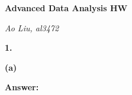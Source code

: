 \documentclass[letterpaper,11pt]{article}
\begin{document}
\begin{center}
	\textbf{\Huge{Advanced Data Analysis HW}}
\end{center}

\begin{center}
	\textsl{Ao Liu, al3472}
\end{center}

\bigbreak
\bigbreak
\bigbreak



\begin{addmargin}[-2em]{0em}
  \large{\textbf{1. }}
\end{addmargin}
\textbf{}\par

\begin{addmargin}[-1.1em]{0em}
  \textbf{(a)}\par
\end{addmargin}
\textbf{}\par
\bigbreak
\begin{addmargin}[-0.5em]{0em}
  \textbf{Answer: }
\end{addmargin}
\end{document}
